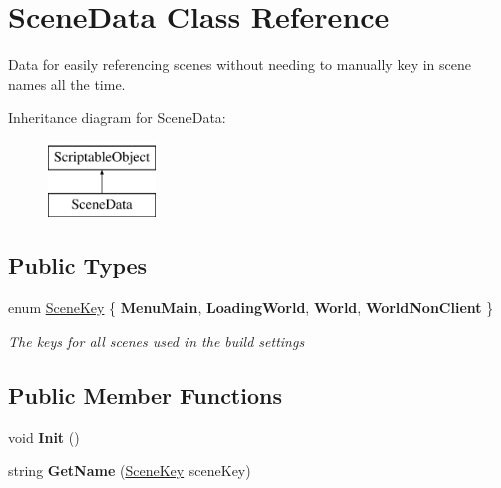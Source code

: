 \hypertarget{class_scene_data}{\section{Scene\-Data Class Reference}
\label{class_scene_data}
}


Data for easily referencing scenes without needing to manually key in scene names all the time.  


Inheritance diagram for Scene\-Data\-:\begin{figure}[H]
\begin{center}
\leavevmode
\includegraphics[height=2.000000cm]{class_scene_data}
\end{center}
\end{figure}
\subsection*{Public Types}
\begin{DoxyCompactItemize}
\item 
enum \hyperlink{class_scene_data_a79d397b3deef242a865470283d96f2e6}{Scene\-Key} \{ {\bfseries Menu\-Main}, 
{\bfseries Loading\-World}, 
{\bfseries World}, 
{\bfseries World\-Non\-Client}
 \}
\begin{DoxyCompactList}\small\item\em The keys for all scenes used in the build settings \end{DoxyCompactList}\end{DoxyCompactItemize}
\subsection*{Public Member Functions}
\begin{DoxyCompactItemize}
\item 
\hypertarget{class_scene_data_a43c1711e6ed670a2d0b819a24a6eba2f}{void {\bfseries Init} ()}\label{class_scene_data_a43c1711e6ed670a2d0b819a24a6eba2f}

\item 
\hypertarget{class_scene_data_a7fae0b056b9093700b9651b9a57e7abb}{string {\bfseries Get\-Name} (\hyperlink{class_scene_data_a79d397b3deef242a865470283d96f2e6}{Scene\-Key} scene\-Key)}\label{class_scene_data_a7fae0b056b9093700b9651b9a57e7abb}

\end{DoxyCompactItemize}
